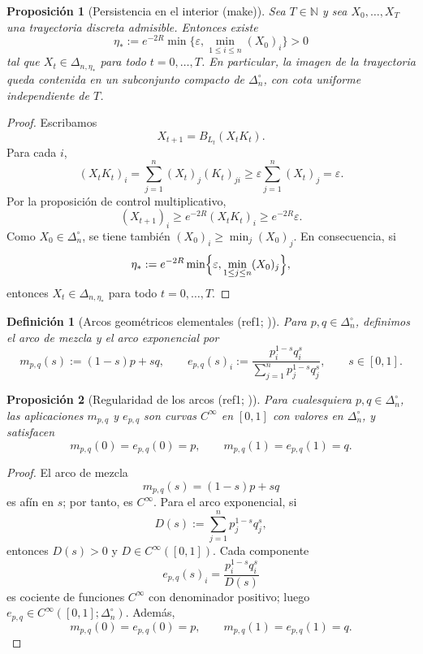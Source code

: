 ﻿\documentclass[12pt]{article}
\newcommand{\fuente}[1]{\textnormal{(#1)}}
\newcommand{\fuentecite}[2]{\textnormal{(#1; \citealp{#2})}}
\newtheorem{definicion}{Definición}[section]
\newtheorem{proposicion}{Proposición}[section]
\begin{document}
\begin{proposicion}[Persistencia en el interior \fuente{make}]
Sea \(T\in\mathbb N\) y sea \(X_0,\dots,X_T\) una trayectoria discreta admisible. Entonces existe
\[
 \eta_*:=e^{-2R}\min\!\bigl\{\varepsilon,\min_{1\le i\le n}(X_0)_i\bigr\}>0
\]
tal que \(X_t\in \Delta_{n,\eta_*}\) para todo \(t=0,\dots,T\). En particular, la imagen de la trayectoria queda contenida en un subconjunto compacto de \(\Delta_n^\circ\), con cota uniforme independiente de \(T\).
\end{proposicion}
\begin{proof}
Escribamos
\[
X_{t+1}=B_{L_t}(X_tK_t).
\]
Para cada \(i\),
\[
(X_tK_t)_i=\sum_{j=1}^n (X_t)_j (K_t)_{ji}
\ge \varepsilon\sum_{j=1}^n (X_t)_j
=\varepsilon.
\]
Por la proposición de control multiplicativo,
\[
(X_{t+1})_i\ge e^{-2R}(X_tK_t)_i\ge e^{-2R}\varepsilon.
\]
Como \(X_0\in\Delta_n^\circ\), se tiene también \((X_0)_i\ge \min_j(X_0)_j\). En consecuencia, si
\[
\eta_*:=e^{-2R}\min\Bigl\{\varepsilon,\min_{1\le j\le n}(X_0)_j\Bigr\},
\]
entonces \(X_t\in\Delta_{n,\eta_*}\) para todo \(t=0,\dots,T\).
\end{proof}

\begin{definicion}[Arcos geométricos elementales \fuentecite{ref1}{PistoneShoaib2024Axioms}]
Para \(p,q\in\Delta_n^\circ\), definimos el \emph{arco de mezcla} y el \emph{arco exponencial} por
\[
m_{p,q}(s):=(1-s)p+sq,
\qquad
e_{p,q}(s)_i:=\frac{p_i^{1-s}q_i^s}{\sum_{j=1}^n p_j^{1-s}q_j^s},
\qquad s\in[0,1].
\]
\end{definicion}

\begin{proposicion}[Regularidad de los arcos \fuentecite{ref1}{PistoneShoaib2024Axioms}]
Para cualesquiera \(p,q\in\Delta_n^\circ\), las aplicaciones \(m_{p,q}\) y \(e_{p,q}\) son curvas \(C^\infty\) en \([0,1]\) con valores en \(\Delta_n^\circ\), y satisfacen
\[
m_{p,q}(0)=e_{p,q}(0)=p,
\qquad
m_{p,q}(1)=e_{p,q}(1)=q.
\]
\end{proposicion}
\begin{proof}
El arco de mezcla
\[
m_{p,q}(s)=(1-s)p+sq
\]
es afín en \(s\); por tanto, es \(C^\infty\). Para el arco exponencial, si
\[
D(s):=\sum_{j=1}^n p_j^{1-s}q_j^s,
\]
entonces \(D(s)>0\) y \(D\in C^\infty([0,1])\). Cada componente
\[
e_{p,q}(s)_i=\frac{p_i^{1-s}q_i^s}{D(s)}
\]
es cociente de funciones \(C^\infty\) con denominador positivo; luego \(e_{p,q}\in C^\infty([0,1];\Delta_n^\circ)\). Además,
\[
m_{p,q}(0)=e_{p,q}(0)=p,
\qquad
m_{p,q}(1)=e_{p,q}(1)=q.
\]
\end{proof}
\end{document}
